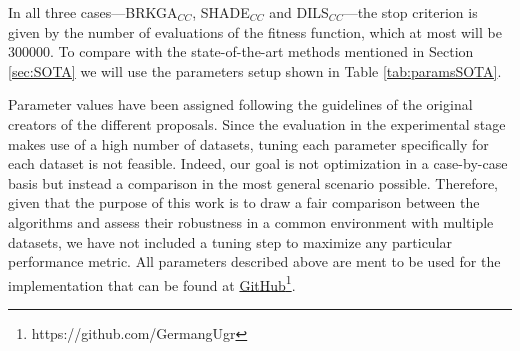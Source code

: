 In all three cases---\acs{BRKGA}$_{CC}$, \acs{SHADE}$_{CC}$ and \acs{DILS}$_{CC}$---the stop criterion is given by the number of evaluations of the fitness function, which at most will be 300000. To compare with the state-of-the-art methods mentioned in Section \ref{sec:SOTA} we will use the parameters setup shown in Table \ref{tab:paramsSOTA}.

\begin{table}[!h]
	\centering
	\setlength{\tabcolsep}{7pt}
	\renewcommand{\arraystretch}{1.4}
	
	\caption{Parameters setup used for the state-of-the-art algorithms.}
	\label{tab:paramsSOTA}
\end{table}

Parameter values have been assigned following the guidelines of the original creators of the different proposals. Since the evaluation in the experimental stage makes use of a high number of datasets, tuning each parameter specifically for each dataset is not feasible. Indeed, our goal is not optimization in a case-by-case basis but instead a comparison in the most general scenario possible. Therefore, given that the purpose of this work is to draw a fair comparison between the algorithms and assess their robustness in a common environment with multiple datasets, we have not included a tuning step to maximize any particular performance metric. All parameters described above are ment to be used for the implementation that can be found at \href{https://github.com/GermangUgr}{GitHub}\footnote{https://github.com/GermangUgr}.


